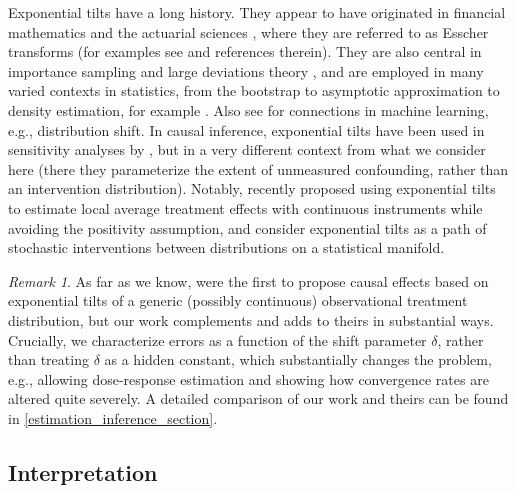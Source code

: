 \documentclass[11pt,twoside]{article}
\theoremstyle{definition}
\theoremstyle{remark}
\newtheorem{remark}{Remark}
\begin{document}
Exponential tilts have a long history. They appear to have originated in financial mathematics and the actuarial sciences \citep{escher1932probability}, where they are referred to as Esscher transforms (for examples see \citet{gerber1993option, elliott2005option} and references therein). They are also central in importance sampling \citep{siegmund1976importance} and large deviations theory \citep{ellis2007entropy}, and are employed in many varied contexts in statistics, from the bootstrap to asymptotic approximation to density estimation, for example \citep{efron1981nonparametric, field1982small, vernon_johns_1988, efron1996using, bayes_emp_2005, qin1999empirical, rare_event}. Also see \citet{maity2022understanding} for connections in machine learning, e.g., distribution shift. In causal inference, exponential tilts have been used in sensitivity analyses by \citet{robins2000sensitivity, franks2020flexible, scharfstein2021semiparametric}, but in a very different context from what we consider here (there they parameterize the extent of unmeasured confounding, rather than an intervention distribution). Notably, \cite{rakshit2024localeffectscontinuousinstruments}  recently proposed using exponential tilts to estimate local average treatment effects with continuous instruments while avoiding the positivity assumption, and \cite{schindl2025causalgeodesycounterfactualestimation} consider exponential tilts as a path of stochastic interventions between distributions on a statistical manifold.

\begin{remark}
As far as we know, \cite{diaz2020causal} were the first to propose causal effects based on exponential tilts of a generic (possibly continuous) observational treatment distribution, but our work complements and adds to theirs in substantial ways. Crucially, we characterize errors as a function of the shift parameter $\delta$, rather than treating $\delta$ as a hidden constant, which substantially changes the problem, e.g., allowing dose-response estimation and showing how convergence rates are altered quite severely. A detailed comparison of our work and theirs can be found in \cref{estimation_inference_section}.
\end{remark}

\subsection{Interpretation}
\end{document}
